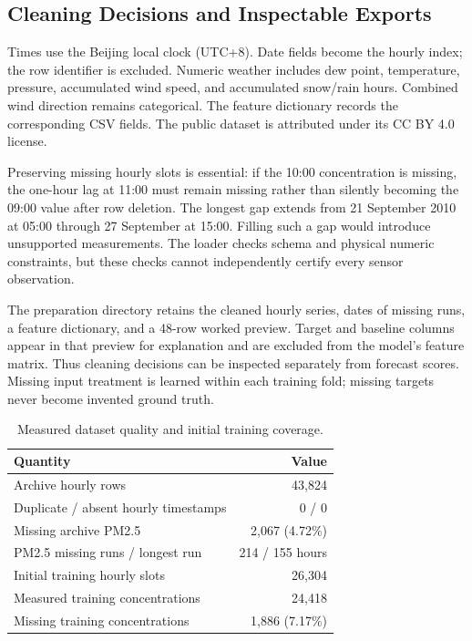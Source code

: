 \documentclass[conference]{IEEEtran}
\begin{document}
\subsection{Cleaning Decisions and Inspectable Exports}
Times use the Beijing local clock (UTC+8). Date fields become the hourly index; the row identifier is excluded. Numeric weather includes dew point, temperature, pressure, accumulated wind speed, and accumulated snow/rain hours. Combined wind direction remains categorical. The feature dictionary records the corresponding CSV fields. The public dataset is attributed under its CC BY 4.0 license.

Preserving missing hourly slots is essential: if the 10:00 concentration is missing, the one-hour lag at 11:00 must remain missing rather than silently becoming the 09:00 value after row deletion. The longest gap extends from 21 September 2010 at 05:00 through 27 September at 15:00. Filling such a gap would introduce unsupported measurements. The loader checks schema and physical numeric constraints, but these checks cannot independently certify every sensor observation.

The preparation directory retains the cleaned hourly series, dates of missing runs, a feature dictionary, and a 48-row worked preview. Target and baseline columns appear in that preview for explanation and are excluded from the model's feature matrix. Thus cleaning decisions can be inspected separately from forecast scores. Missing input treatment is learned within each training fold; missing targets never become invented ground truth.

\begin{table}[ht]
\centering
\caption{Measured dataset quality and initial training coverage.}
\label{tab:audit}
\begin{tabular}{lr}
\toprule
Quantity & Value\\\midrule
Archive hourly rows & 43,824\\
Duplicate / absent hourly timestamps & 0 / 0\\
Missing archive PM2.5 & 2,067 (4.72\%)\\
PM2.5 missing runs / longest run & 214 / 155 hours\\
Initial training hourly slots & 26,304\\
Measured training concentrations & 24,418\\
Missing training concentrations & 1,886 (7.17\%)\\\bottomrule
\end{tabular}
\end{table}
\end{document}
